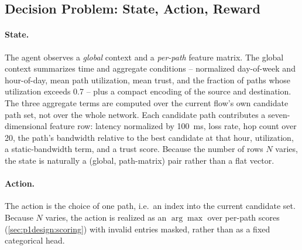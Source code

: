 \subsection{Decision Problem: State, Action, Reward}
\label{sec:p1design:mdp}

\paragraph{State.} The agent observes a \emph{global} context and a \emph{per-path} feature matrix. The
global context summarizes time and aggregate conditions -- normalized day-of-week and hour-of-day, mean
path utilization, mean trust, and the fraction of paths whose utilization exceeds 0.7 -- plus a compact
encoding of the source and destination. The three aggregate terms are computed over the current flow's
own candidate path set, not over the whole network. Each candidate path contributes a seven-dimensional
feature row: latency normalized by \SI{100}{\milli\second}, loss rate, hop count over 20, the path's
bandwidth relative to the best candidate at that hour, utilization, a static-bandwidth term, and a trust
score. Because the number of rows $N$ varies, the state is naturally a (global, path-matrix) pair rather
than a flat vector.

\paragraph{Action.} The action is the choice of one path, i.e.\ an index into the current candidate set.
Because $N$ varies, the action is realized as an $\arg\max$ over per-path scores (\cref{sec:p1design:scoring})
with invalid entries masked, rather than as a fixed categorical head.

